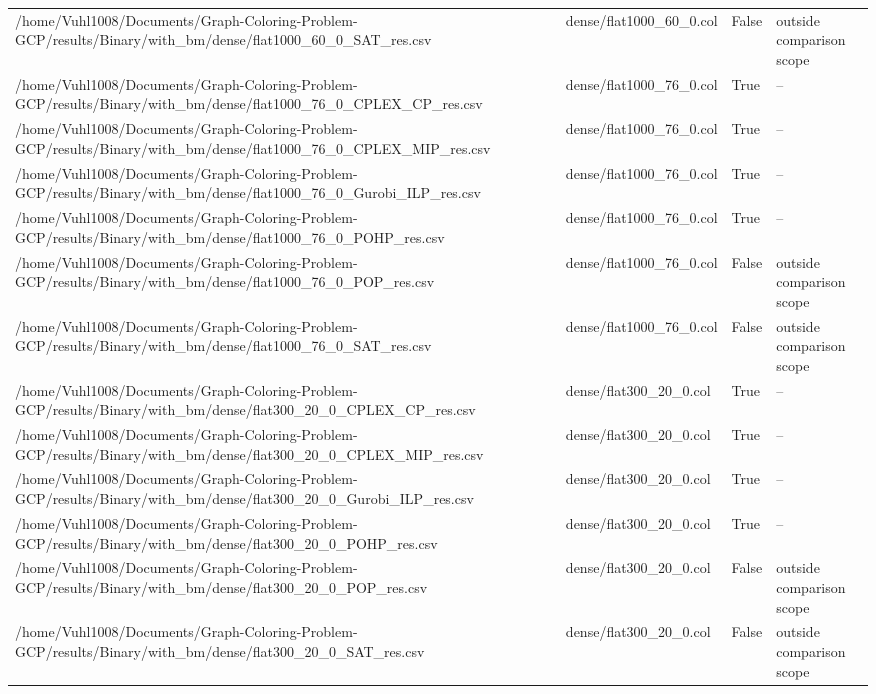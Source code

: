 \begin{table}[htbp]
\begin{tabular}{llll}
/home/Vuhl1008/Documents/Graph-Coloring-Problem-GCP/results/Binary/with\_bm/dense/flat1000\_60\_0\_SAT\_res.csv & dense/flat1000\_60\_0.col & False & outside comparison scope \\
/home/Vuhl1008/Documents/Graph-Coloring-Problem-GCP/results/Binary/with\_bm/dense/flat1000\_76\_0\_CPLEX\_CP\_res.csv & dense/flat1000\_76\_0.col & True & -- \\
/home/Vuhl1008/Documents/Graph-Coloring-Problem-GCP/results/Binary/with\_bm/dense/flat1000\_76\_0\_CPLEX\_MIP\_res.csv & dense/flat1000\_76\_0.col & True & -- \\
/home/Vuhl1008/Documents/Graph-Coloring-Problem-GCP/results/Binary/with\_bm/dense/flat1000\_76\_0\_Gurobi\_ILP\_res.csv & dense/flat1000\_76\_0.col & True & -- \\
/home/Vuhl1008/Documents/Graph-Coloring-Problem-GCP/results/Binary/with\_bm/dense/flat1000\_76\_0\_POHP\_res.csv & dense/flat1000\_76\_0.col & True & -- \\
/home/Vuhl1008/Documents/Graph-Coloring-Problem-GCP/results/Binary/with\_bm/dense/flat1000\_76\_0\_POP\_res.csv & dense/flat1000\_76\_0.col & False & outside comparison scope \\
/home/Vuhl1008/Documents/Graph-Coloring-Problem-GCP/results/Binary/with\_bm/dense/flat1000\_76\_0\_SAT\_res.csv & dense/flat1000\_76\_0.col & False & outside comparison scope \\
/home/Vuhl1008/Documents/Graph-Coloring-Problem-GCP/results/Binary/with\_bm/dense/flat300\_20\_0\_CPLEX\_CP\_res.csv & dense/flat300\_20\_0.col & True & -- \\
/home/Vuhl1008/Documents/Graph-Coloring-Problem-GCP/results/Binary/with\_bm/dense/flat300\_20\_0\_CPLEX\_MIP\_res.csv & dense/flat300\_20\_0.col & True & -- \\
/home/Vuhl1008/Documents/Graph-Coloring-Problem-GCP/results/Binary/with\_bm/dense/flat300\_20\_0\_Gurobi\_ILP\_res.csv & dense/flat300\_20\_0.col & True & -- \\
/home/Vuhl1008/Documents/Graph-Coloring-Problem-GCP/results/Binary/with\_bm/dense/flat300\_20\_0\_POHP\_res.csv & dense/flat300\_20\_0.col & True & -- \\
/home/Vuhl1008/Documents/Graph-Coloring-Problem-GCP/results/Binary/with\_bm/dense/flat300\_20\_0\_POP\_res.csv & dense/flat300\_20\_0.col & False & outside comparison scope \\
/home/Vuhl1008/Documents/Graph-Coloring-Problem-GCP/results/Binary/with\_bm/dense/flat300\_20\_0\_SAT\_res.csv & dense/flat300\_20\_0.col & False & outside comparison scope \\

\end{tabular}
\end{table}
